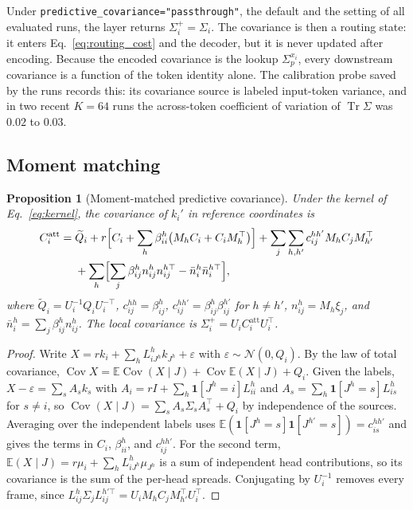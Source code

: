 \documentclass[11pt]{article}
\newtheorem{proposition}{Proposition}
\theoremstyle{definition}
\theoremstyle{remark}
\newcommand{\Tr}{\operatorname{Tr}}
\newcommand{\E}{\mathbb{E}}
\newcommand{\N}{\mathcal{N}}
\newcommand{\Cov}{\operatorname{Cov}}
\newcommand{\cfg}[1]{\texttt{#1}}
\begin{document}
Under \cfg{predictive\_covariance="passthrough"}, the default and the setting of all evaluated runs, the layer returns $\Sigma_i^{+}=\Sigma_i$. The covariance is then a routing state: it enters Eq.~\eqref{eq:routing_cost} and the decoder, but it is never updated after encoding. Because the encoded covariance is the lookup $\Sigma_p^{x_i}$, every downstream covariance is a function of the token identity alone. The calibration probe saved by the runs records this: its covariance source is labeled input-token variance, and in two recent $K=64$ runs the across-token coefficient of variation of $\Tr\Sigma$ was $0.02$ to $0.03$.

\subsection{Moment matching}

\begin{proposition}[Moment-matched predictive covariance]
\label{prop:covariance}
Under the kernel of Eq.~\eqref{eq:kernel}, the covariance of $k_i'$ in reference coordinates is
\begin{equation}
\begin{aligned}
C_i^{\mathrm{att}}={}&\widetilde Q_i
+r\Bigl[C_i+\sum_h\beta_{ii}^{h}\bigl(M_hC_i+C_iM_h^{\top}\bigr)\Bigr]
+\sum_j\sum_{h,h'}c_{ij}^{hh'}M_hC_jM_{h'}^{\top}\\
&+\sum_h\Bigl[\sum_j\beta_{ij}^{h}n_{ij}^{h}n_{ij}^{h\top}-\bar n_i^{h}\bar n_i^{h\top}\Bigr],
\end{aligned}
\label{eq:covariance}
\end{equation}
where $\widetilde Q_i=U_i^{-1}Q_iU_i^{-\top}$, $c_{ij}^{hh}=\beta_{ij}^{h}$, $c_{ij}^{hh'}=\beta_{ij}^{h}\beta_{ij}^{h'}$ for $h\ne h'$, $n_{ij}^{h}=M_h\xi_j$, and $\bar n_i^{h}=\sum_j\beta_{ij}^{h}n_{ij}^{h}$. The local covariance is $\Sigma_i^{+}=U_iC_i^{\mathrm{att}}U_i^{\top}$.
\end{proposition}

\begin{proof}
Write $X=rk_i+\sum_hL_{iJ^h}^{h}k_{J^h}+\varepsilon$ with $\varepsilon\sim\N(0,Q_i)$. By the law of total covariance, $\Cov X=\E\Cov(X\mid J)+\Cov\E(X\mid J)+Q_i$. Given the labels, $X-\varepsilon=\sum_sA_sk_s$ with $A_i=rI+\sum_h\mathbf 1[J^h=i]L_{ii}^{h}$ and $A_s=\sum_h\mathbf 1[J^h=s]L_{is}^{h}$ for $s\ne i$, so $\Cov(X\mid J)=\sum_sA_s\Sigma_sA_s^{\top}+Q_i$ by independence of the sources. Averaging over the independent labels uses $\E(\mathbf 1[J^h=s]\mathbf 1[J^{h'}=s])=c_{is}^{hh'}$ and gives the terms in $C_i$, $\beta_{ii}^{h}$, and $c_{ij}^{hh'}$. For the second term, $\E(X\mid J)=r\mu_i+\sum_hL_{iJ^h}^{h}\mu_{J^h}$ is a sum of independent head contributions, so its covariance is the sum of the per-head spreads. Conjugating by $U_i^{-1}$ removes every frame, since $L_{ij}^{h}\Sigma_jL_{ij}^{h'\top}=U_iM_hC_jM_{h'}^{\top}U_i^{\top}$.
\end{proof}
\end{document}
